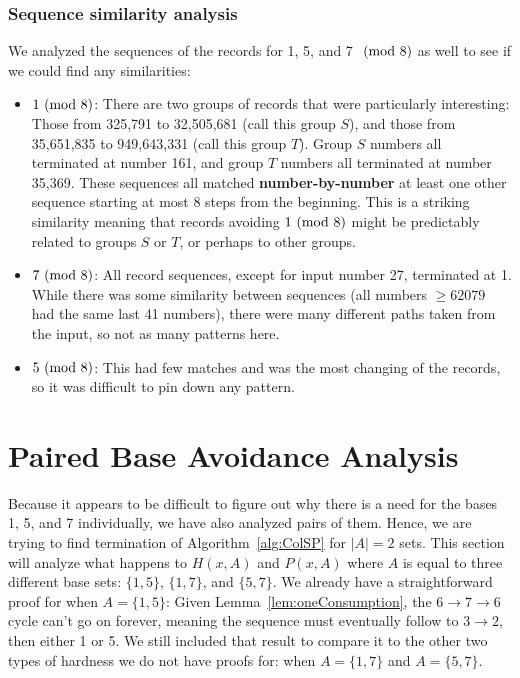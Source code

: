 \subsubsection{Sequence similarity analysis} \label{subsubsec:algseqsim}
We analyzed the sequences of the records for 1, 5, and 7 $\ (\mathrm{mod}\ 8)$ as well to see if we could find any similarities:
\begin{itemize}
    \item $1\ (\mathrm{mod}\ 8)$: There are two groups of records that were particularly interesting: Those from 325,791 to 32,505,681 (call this group $S$), and those from 35,651,835 to 949,643,331 (call this group $T$). Group $S$ numbers all terminated at number 161, and group $T$ numbers all terminated at number 35,369. These sequences all matched \textbf{number-by-number} at least one other sequence starting at most 8
    steps from the beginning. This is a striking similarity meaning that records avoiding $1 \ (\mathrm{mod}\ 8)$ might be predictably related to groups $S$ or $T$, or perhaps to other groups.
    \item $7 \ (\mathrm{mod}\ 8)$: All record sequences, except for input number 27, terminated at 1. While there was some similarity between sequences (all numbers $\geq 62079$ had the same last 41 numbers), there were many different paths taken from the input, so not as many patterns here.
    \item $5 \ (\mathrm{mod}\ 8)$: This had few matches and was the most changing of the records, so it was difficult to pin down any pattern.
\end{itemize}
\section{Paired Base Avoidance Analysis} \label{subsec:algpairedbase}
Because it appears to be difficult to figure out why there is a need for the bases 1, 5, and 7 individually, we have also analyzed pairs of them. Hence, we are trying to find termination of Algorithm~\ref{alg:ColSP} for $|A| = 2$ sets. This section will analyze what happens to $H(x,A)$ and $P(x,A)$ where $A$ is equal to three different base sets: $\{1,5\}$, $\{1,7\}$, and $\{5,7\}$. We already have a straightforward proof for when $A = \{1, 5\}$: Given Lemma~\ref{lem:oneConsumption}, the $6 \rightarrow 7 \rightarrow 6$ cycle can't go on forever, meaning the sequence must eventually follow to $3 \rightarrow 2$, then either 1 or 5. We still included that result to compare it to the other two types of hardness we do not have proofs for: when $A = \{1,7\}$ and $A = \{5,7\}$.

